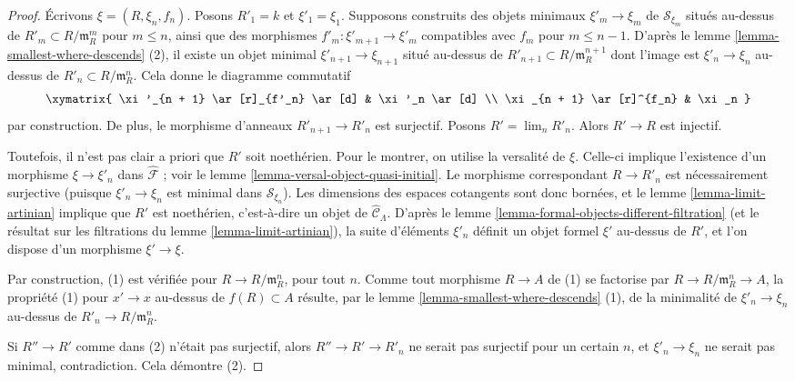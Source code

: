 \begin{proof}
Écrivons $\xi = (R, \xi_n, f_n)$. Posons $R'_1 = k$ et
$\xi'_1 = \xi_1$. Supposons construits des objets minimaux
$\xi'_m \to \xi_m$ de $\mathcal{S}_{\xi_m}$ situés au-dessus de
$R'_m \subset R/\mathfrak m_R^m$ pour $m \leq n$, ainsi que des morphismes
$f'_m : \xi'_{m + 1} \to \xi'_m$ compatibles avec $f_m$
pour $m \leq n - 1$. D'après
le lemme \ref{lemma-smallest-where-descends} (2), il existe un objet minimal
$\xi'_{n + 1} \to \xi_{n + 1}$ situé au-dessus de
$R'_{n + 1} \subset R/\mathfrak m_R^{n + 1}$ dont l'image est
$\xi'_n \to \xi_n$ au-dessus de $R'_n \subset R/\mathfrak m_R^n$. Cela donne
le diagramme commutatif
$$
\xymatrix{
\xi'_{n + 1} \ar[r]_{f'_n} \ar[d] & \xi'_n \ar[d] \\
\xi_{n + 1} \ar[r]^{f_n} & \xi_n
}
$$
par construction. De plus, le morphisme d'anneaux
$R'_{n + 1} \to R'_n$ est surjectif. Posons $R' = \lim_n R'_n$. Alors
$R' \to R$ est injectif.

\medskip\noindent
Toutefois, il n'est pas clair a priori que $R'$ soit noethérien. Pour le
montrer, on utilise la versalité de $\xi$. Celle-ci implique l'existence d'un
morphisme $\xi \to \xi'_n$ dans $\widehat{\mathcal{F}}$ ; voir le lemme
\ref{lemma-versal-object-quasi-initial}. Le morphisme correspondant
$R \to R'_n$ est nécessairement surjective (puisque
$\xi'_n \to \xi_n$ est minimal dans $\mathcal{S}_{\xi_n}$). Les dimensions
des espaces cotangents sont donc bornées, et le lemme
\ref{lemma-limit-artinian} implique que $R'$ est noethérien, c'est-à-dire un
objet de $\widehat{\mathcal{C}}_\Lambda$. D'après le lemme
\ref{lemma-formal-objects-different-filtration} (et le résultat sur les
filtrations du lemme \ref{lemma-limit-artinian}), la suite d'éléments
$\xi'_n$ définit un objet formel $\xi'$ au-dessus de $R'$, et l'on dispose
d'un morphisme $\xi' \to \xi$.

\medskip\noindent
Par construction, (1) est vérifiée pour $R \to R/\mathfrak m_R^n$, pour tout
$n$. Comme tout morphisme $R \to A$ de (1) se factorise par
$R \to R/\mathfrak m_R^n \to A$, la propriété (1) pour $x' \to x$ au-dessus
de $f(R) \subset A$ résulte, par le lemme
\ref{lemma-smallest-where-descends} (1), de la minimalité de
$\xi'_n \to \xi_n$ au-dessus de $R'_n \to R/\mathfrak m_R^n$.

\medskip\noindent
Si $R'' \to R'$ comme dans (2) n'était pas surjectif, alors
$R'' \to R' \to R'_n$ ne serait pas surjectif pour un certain $n$, et
$\xi'_n \to \xi_n$ ne serait pas minimal, contradiction. Cela démontre (2).
\end{proof}


